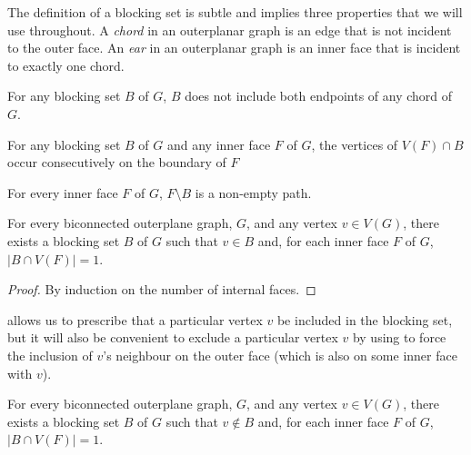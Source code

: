 \documentclass{patmorin}
\begin{document}
The definition of a blocking set is subtle and implies three properties
that we will use throughout. A \emph{chord} in an outerplanar graph is
an edge that is not incident to the outer face.  An \emph{ear} in an
outerplanar graph is an inner face that is incident to exactly one chord.

\begin{obs}
   For any blocking set $B$ of $G$, $B$ does not include both endpoints
   of any chord of $G$.
\end{obs}

\begin{obs}
   For any blocking set $B$ of $G$ and any inner face $F$ of $G$, the
   vertices of $V(F)\cap B$ occur consecutively on the boundary of $F$ 
\end{obs}

\begin{obs}
  For every inner face $F$ of $G$, $F \setminus B$ is a non-empty path.
  \label{claim:facesMinusBarePaths}
\end{obs}


\begin{lem}
  For every biconnected outerplane graph, $G$, and any vertex $v\in
  V(G)$, there exists a blocking set $B$ of $G$ such that $v\in B$ and,
  for each inner face $F$ of $G$, $|B\cap V(F)|=1$.
\end{lem}

\begin{proof}
  By induction on the number of internal faces.
\end{proof}

 allows us to prescribe that a particular vertex
$v$ be included in the blocking set, but it will also be convenient to
exclude a particular vertex $v$ by using  to force
the inclusion of $v$'s neighbour on the outer face (which is also on
some inner face with $v$).

\begin{cor}
  For every biconnected outerplane graph, $G$, and any vertex $v\in
  V(G)$, there exists a blocking set $B$ of $G$ such that $v\not\in B$ and,
  for each inner face $F$ of $G$, $|B\cap V(F)|=1$.
\end{cor}
\end{document}

